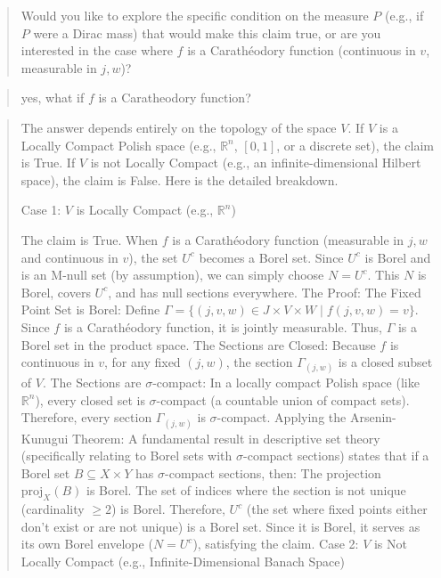 \begin{Rem}
{\begin{quote}
Would you like to explore the specific condition on the measure $P$ (e.g., if $P$ were a Dirac mass) that would make this claim true, or are you interested in the case where $f$ is a Carathéodory function (continuous in $v$, measurable in $j,w$)?

    \end{quote}
    \begin{quote}
yes, what if $f$ is a Caratheodory function?
    \end{quote}
    \begin{quote}
The answer depends entirely on the topology of the space $V$.
If $V$ is a Locally Compact Polish space (e.g., $\mathbb{R}^n$, $[0,1]$, or a discrete set), the claim is True.
If $V$ is not Locally Compact (e.g., an infinite-dimensional Hilbert space), the claim is False.
Here is the detailed breakdown.

Case 1: $V$ is Locally Compact (e.g., $\mathbb{R}^n$)

The claim is True.
When $f$ is a Carathéodory function (measurable in $j,w$ and continuous in $v$), the set $U^c$ becomes a Borel set. Since $U^c$ is Borel and is an M-null set (by assumption), we can simply choose $N = U^c$. This $N$ is Borel, covers $U^c$, and has null sections everywhere.
The Proof:
The Fixed Point Set is Borel:
Define $\Gamma = \{ (j, v, w) \in J \times V \times W \mid f(j, v, w) = v \}$.
Since $f$ is a Carathéodory function, it is jointly measurable. Thus, $\Gamma$ is a Borel set in the product space.
The Sections are Closed:
Because $f$ is continuous in $v$, for any fixed $(j, w)$, the section $\Gamma_{(j,w)}$ is a closed subset of $V$.
The Sections are $\sigma$-compact:
In a locally compact Polish space (like $\mathbb{R}^n$), every closed set is $\sigma$-compact (a countable union of compact sets). Therefore, every section $\Gamma_{(j,w)}$ is $\sigma$-compact.
Applying the Arsenin-Kunugui Theorem:
A fundamental result in descriptive set theory (specifically relating to Borel sets with $\sigma$-compact sections) states that if a Borel set $B \subseteq X \times Y$ has $\sigma$-compact sections, then:
The projection $\text{proj}_X(B)$ is Borel.
The set of indices where the section is not unique (cardinality $\ge 2$) is Borel.
Therefore, $U^c$ (the set where fixed points either don't exist or are not unique) is a Borel set. Since it is Borel, it serves as its own Borel envelope ($N=U^c$), satisfying the claim.
Case 2: $V$ is Not Locally Compact (e.g., Infinite-Dimensional Banach Space)


\end{quote}}
\end{Rem}
